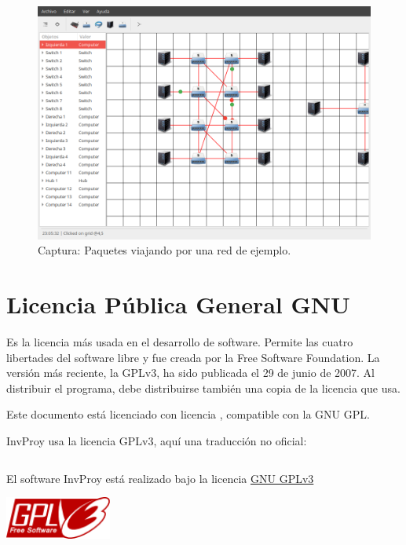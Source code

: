 \documentclass[a4paper, 11pt]{report} %
\begin{document}
\begin{figure}[H]
\includegraphics[width=\textwidth]{Resources/Screenshots/2016-09-12-230644_1000x700_scrot.png}
\caption{Captura: Paquetes viajando por una red de ejemplo.}
\label{fig:samplenet}
\end{figure}

\chapter[Licencia GNU GPL]{Licencia Pública General GNU}
\label{gnugpl}
Es la licencia más usada en el desarrollo de software. Permite las cuatro libertades del software libre y fue creada por la Free Software Foundation. La versión más reciente, la GPLv3, ha sido publicada el 29 de junio de 2007. Al distribuir el programa, debe distribuirse también una copia de la licencia que usa.

Este documento está licenciado con licencia \doclicenseLongNameRef, compatible con la GNU GPL.

InvProy usa la licencia GPLv3, aquí una traducción no oficial\cite{gpltranslation}:
\inputminted[baselinestretch=1, fontsize=\scriptsize, linenos, breaklines]{text}{GPLv3-spanish.txt}
%



\newpage
\thispagestyle{empty}
\vspace*{2cm}
\doclicenseThis

\noindent
\begin{minipage}{0.7\textwidth}
\noindent El software InvProy está realizado bajo la licencia \href{https://www.gnu.org/licenses/quick-guide-gplv3.html}{GNU GPLv3}
\end{minipage}
\hspace*{\fill}
\begin{minipage}{0.3\textwidth}
\hspace*{\fill}
\includegraphics[height=1.4cm]{Resources/gplv3-127x51.png}
\end{minipage}
\end{document}
